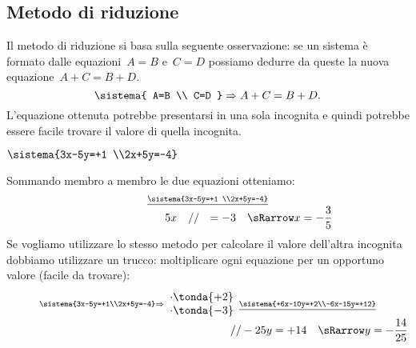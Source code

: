 \subsection{Metodo di riduzione}
Il metodo di riduzione si basa sulla seguente osservazione: se un
sistema è formato dalle equazioni~\(A=B\) e~\(C=D\) possiamo dedurre
da queste la nuova equazione~\(A+C=B+D\).
\begin{equation*}
\sistema{
A=B \\
C=D
}\Rightarrow A+C=B+D.
\end{equation*}
L'equazione ottenuta potrebbe presentarsi in una sola
incognita e quindi potrebbe essere facile trovare il valore di quella
incognita.

\begin{esempio}{}{}
\(\sistema{3x-5y=+1 \\2x+5y=-4}\)

Sommando membro a membro le due equazioni otteniamo:
\[\stackrel{\underline{\sistema{3x-5y=+1 \\2x+5y=-4}}}
  {\qquad \qquad \qquad ~~~~5x ~~~ // ~~ =
   -3 \quad \sRarrow x=-\frac{3}{5}}\]
Se vogliamo utilizzare lo stesso metodo per calcolare il valore dell'altra 
incognita dobbiamo utilizzare un trucco: moltiplicare ogni equazione per un 
opportuno valore (facile da trovare):
\[\stackrel{\sistema{3x-5y=+1\\2x+5y=-4}\Rightarrow
\begin{array}{l}\cdot \tonda{+2}\\ \cdot \tonda{-3}\end{array}
  \underline{\sistema{+6x-10y=+2\\-6x-15y=+12}}}
  {\qquad \qquad \qquad \qquad \qquad \qquad \qquad \qquad \qquad \qquad 
   //  -25y  =+14 \quad \sRarrow y=-\frac{14}{25}}\]
\end{esempio}

